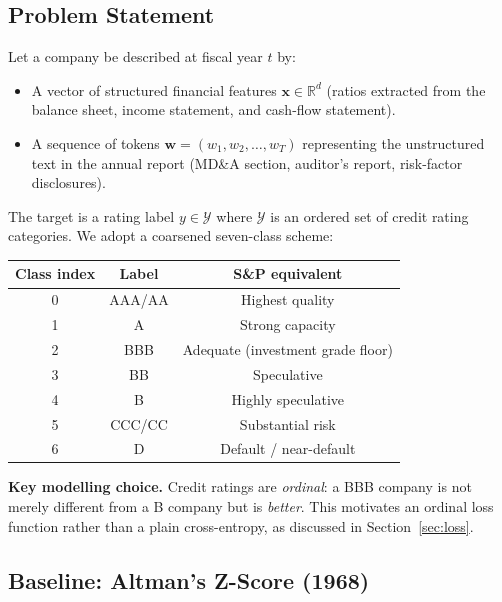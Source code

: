 \documentclass[12pt, a4paper]{article}
\begin{document}
\subsection{Problem Statement}

Let a company be described at fiscal year $t$ by:
\begin{itemize}
  \item A vector of structured financial features $\mathbf{x} \in \mathbb{R}^d$ (ratios extracted from the balance sheet, income statement, and cash-flow statement).
  \item A sequence of tokens $\mathbf{w} = (w_1, w_2, \ldots, w_T)$ representing the unstructured text in the annual report (MD\&A section, auditor's report, risk-factor disclosures).
\end{itemize}

The target is a rating label $y \in \mathcal{Y}$ where $\mathcal{Y}$ is an ordered set of credit rating categories.  We adopt a coarsened seven-class scheme:

\begin{center}
\begin{tabular}{ccc}
  \toprule
  \textbf{Class index} & \textbf{Label} & \textbf{S\&P equivalent} \\
  \midrule
  0 & AAA/AA & Highest quality \\
  1 & A      & Strong capacity \\
  2 & BBB    & Adequate (investment grade floor) \\
  3 & BB     & Speculative \\
  4 & B      & Highly speculative \\
  5 & CCC/CC & Substantial risk \\
  6 & D      & Default / near-default \\
  \bottomrule
\end{tabular}
\end{center}

\begin{keyinsight}
\textbf{Key modelling choice.}  Credit ratings are \emph{ordinal}: a BBB company is not merely different from a B company but is \emph{better}.  This motivates an ordinal loss function rather than a plain cross-entropy, as discussed in Section~\ref{sec:loss}.
\end{keyinsight}

\subsection{Baseline: Altman's Z-Score (1968)}
\label{sec:altman}
\end{document}
